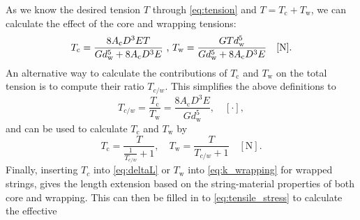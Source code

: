 \documentclass{article}
\begin{document}
\begin{sloppy}
\begin{equation}
\end{equation}
%
As we know the desired tension $T$ through \eqref{eq:tension} and $T = T_\text{c} + T_\text{w}$, we can calculate the effect of the core and wrapping tensions:
%
\begin{equation}
    T_\text{c} = \frac{8A_\text{c}D^3ET}{Gd_\text{w}^5+8A_\text{c}D^3E}\text{ , } \newline
    T_\text{w} = \frac{GTd_\text{w}^5}{Gd_\text{w}^5 + 8A_\text{c}D^3E} \quad [\text{N}].
\end{equation}
%
An alternative way to calculate the contributions of $T_\text{c}$ and $T_\text{w}$ on the total tension is to compute their ratio $T_{c/w}$. This simplifies the above definitions to
%
\begin{equation}
    T_{c/w} = \frac{T_\text{c}}{T_\text{w}} = \frac{8A_\text{c}D^3E}{Gd_\text{w}^5},  \quad [\cdot],
\end{equation}
%
and can be used to calculate $T_\text{c}$ and $T_\text{w}$ by
%
\begin{equation}\label{eq:Tc_derived}
    T_\text{c} = \frac{T}{\frac{1}{T_{c/w}}+1}, \quad T_\text{w} = \frac{T}{T_{c/w}+1}\quad [\text{N}].
\end{equation}
%
Finally, inserting $T_c$ into \eqref{eq:deltaL} or $T_\text{w}$ into \eqref{eq:k_wrapping} for wrapped strings, gives the length extension based on the string-material properties of both core and wrapping. 
This can then be filled in to \eqref{eq:tensile_stress} to calculate the effective
%
%

\end{sloppy}
\end{document}
